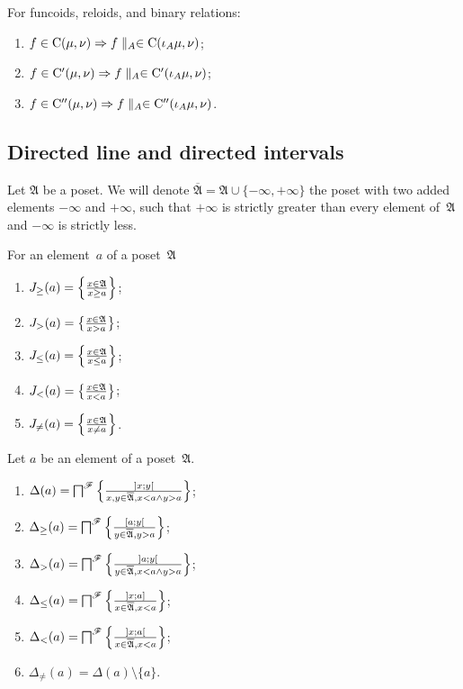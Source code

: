 \begin{prop}
For funcoids, reloids, and binary relations:
\begin{enumerate}
\item $f\in\mathrm{C}(\mu,\nu)\Rightarrow f\parallel_{A}\in\mathrm{C}(\iota_A\mu,\nu)$;
\item $f\in\mathrm{C}'(\mu,\nu)\Rightarrow f\parallel_{A}\in\mathrm{C}'(\iota_A\mu,\nu)$;
\item $f\in\mathrm{C}''(\mu,\nu)\Rightarrow f\parallel_{A}\in\mathrm{C}''(\iota_A\mu,\nu)$. 
\end{enumerate}
\end{prop}

\subsection{Directed line and directed intervals}

Let $\mathfrak{A}$ be a poset. We will denote $\overline{\mathfrak{A}}=\mathfrak{A}\cup\{-\infty,+\infty\}$ the poset
with two added elements $-\infty$ and $+\infty$, such that $+\infty$ is strictly greater than every element of~$\mathfrak{A}$
and $-\infty$ is strictly less.


\begin{defn}
For an element~$a$ of a poset~$\mathfrak{A}$
\begin{enumerate}
\item $J_{\geq}(a) = \left\{ \frac{x\in\mathfrak{A}}{x\geq a}\right\}$;
\item $J_{>}(a) = \left\{ \frac{x\in\mathfrak{A}}{x>a}\right\}$;
\item $J_{\leq}(a) = \left\{ \frac{x\in\mathfrak{A}}{x\leq a}\right\}$;
\item $J_{<}(a) = \left\{ \frac{x\in\mathfrak{A}}{x<a}\right\}$;
\item $J_{\ne}(a) = \left\{ \frac{x\in\mathfrak{A}}{x\ne a}\right\}$.
\end{enumerate}
\end{defn}

\begin{defn}
Let $a$ be an element of a poset~$\mathfrak{A}$.
\begin{enumerate}
\item $\Delta(a) = \bigsqcap^{\mathscr{F}} \left\{ \frac{]x;y[}{x,y\in\overline{\mathfrak{A}}, x<a\land y>a}\right\}$;
\item $\Delta_{\geq}(a) = \bigsqcap^{\mathscr{F}} \left\{ \frac{[a;y[}{y\in\overline{\mathfrak{A}}, y>a}\right\}$;
\item $\Delta_{>}(a) = \bigsqcap^{\mathscr{F}} \left\{ \frac{]a;y[}{y\in\overline{\mathfrak{A}}, x<a\land y>a}\right\}$;
\item $\Delta_{\leq}(a) = \bigsqcap^{\mathscr{F}} \left\{ \frac{]x;a]}{x\in\overline{\mathfrak{A}}, x<a}\right\}$;
\item $\Delta_{<}(a) = \bigsqcap^{\mathscr{F}} \left\{ \frac{]x;a[}{x\in\overline{\mathfrak{A}}, x<a}\right\}$;
\item $\Delta_{\ne}(a) = \Delta(a) \setminus \{a\}$.
\end{enumerate}
\end{defn}

